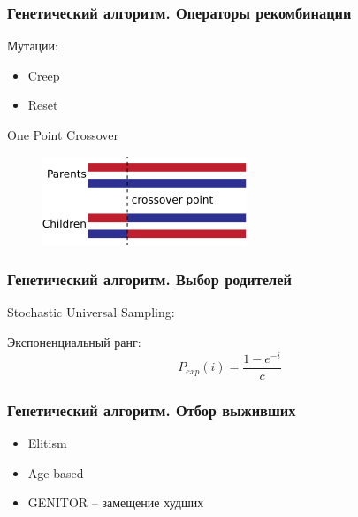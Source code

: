 \documentclass[10pt, unicode]{beamer}
\begin{document}
    \begin{frame}
        \frametitle{Генетический алгоритм. Операторы рекомбинации}
        Мутации:
        \begin{itemize}
            \item Creep
            \item Reset
        \end{itemize}
        One Point Crossover
        \begin{figure}[H]
            \centering
            \includegraphics[scale=1]{OnePointCrossover.png}
        \end{figure}
    \end{frame}
    \begin{frame}
        \frametitle{Генетический алгоритм. Выбор родителей}
        Stochastic Universal Sampling:
        \begin{center}
        \end{center}
        Экспоненциальный ранг:
        \[P_{exp}\left(i\right) = \frac{1 - e^{-i}}{c}\]
    \end{frame}
    \begin{frame}
        \frametitle{Генетический алгоритм. Отбор выживших}
        \begin{itemize}
            \item Elitism
            \item Age based
            \item GENITOR -- замещение худших
        \end{itemize}
    \end{frame}
\end{document}
